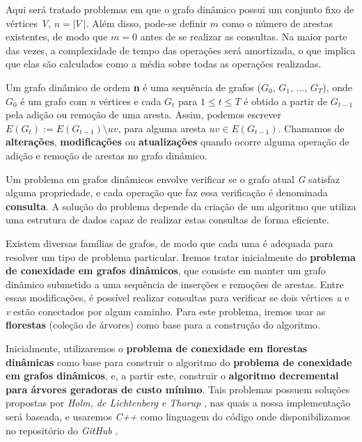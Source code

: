 Aqui será tratado problemas em que o grafo dinâmico possui um conjunto fixo de vértices \textit{V}, $n = |\textit{V}\ |$. Além disso, pode-se definir $m$ como o número de arestas existentes, de modo que $m = 0$ antes de se realizar as consultas. Na maior parte das vezes, a complexidade de tempo das operações será amortizada, o que implica que elas são calculados como a média sobre todas as operações realizadas. 


Um grafo dinâmico de ordem \textbf{n} é uma sequência de grafos ($G_0$, $G_1$, ..., $G_T$), onde $G_0$ é um grafo com \textit{n} vértices e cada $G_t$ para $1 \leq t \leq T$ é obtido a partir de $G_{t-1}$ pela adição ou remoção de uma aresta. Assim, podemos escrever $E(G_{t}) := E(G_{t - 1}) \setminus {uv}$, para alguma aresta $uv \in E(G_{t-1})$. Chamamos de \textbf{alterações}, \textbf{modificações} ou \textbf{atualizações} quando ocorre alguma operação de adição e remoção de arestas no grafo dinâmico.

Um problema em grafos dinâmicos envolve verificar se o grafo atual \textit{G} satisfaz alguma propriedade, e cada operação que faz essa verificação é denominada \textbf{consulta}. A solução do problema depende da criação de um algoritmo que utiliza uma estrutura de dados capaz de realizar estas consultas de forma eficiente. 

Existem diversas famílias de grafos, de modo que cada uma é adequada para resolver um tipo de problema particular. Iremos tratar inicialmente do \textbf{problema de conexidade em grafos dinâmicos}, que consiste em manter um grafo dinâmico submetido a uma sequência de inserções e remoções de arestas. Entre essas modificações, é possível realizar consultas para verificar se dois vértices \textit{u} e \textit{v} estão conectados por algum caminho. Para este problema, iremos usar as \textbf{florestas} (coleção de árvores) como base para a construção do algoritmo.

Inicialmente, utilizaremos o \textbf{problema de conexidade em florestas dinâmicas} como base para construir o algoritmo do \textbf{problema de conexidade em grafos dinâmicos}, e, a partir este, construir o \textbf{algoritmo decremental para árvores geradoras de custo mínimo}. Tais problemas possuem soluções propostas por \textit{Holm, de Lichtenberg e Thorup} \cite{jacob_holm}, nas quais a nossa implementação será baseada, e usaremos \textit{C++} como linguagem do código onde disponibilizamos no repositório do \textit{GitHub} \cite{chung2025}.